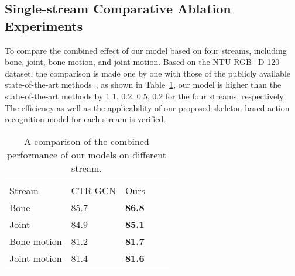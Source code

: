 \documentclass[letterpaper]{article} \usepackage[submission]{aaai23}  \usepackage{times}  \usepackage{helvet}  \usepackage{courier}  \usepackage[hyphens]{url}  \usepackage{graphicx} \urlstyle{rm} \def\UrlFont{\rm}  \usepackage{natbib}  \usepackage{caption} \frenchspacing  \setlength{\pdfpagewidth}{8.5in} \setlength{\pdfpageheight}{11in} \usepackage{algorithm}
\begin{document}
\subsection{Single-stream Comparative Ablation Experiments}
To compare the combined effect of our model based on four streams, including bone, joint, bone motion, and joint motion. Based on the NTU RGB+D 120 dataset, the comparison is made one by one with those of the publicly available state-of-the-art methods~\cite{2021Channel}, as shown in Table~\ref{tab:13}, our model is higher than the state-of-the-art methods by 1.1, 0.2, 0.5, 0.2 for the four streams, respectively. The efficiency as well as the applicability of our proposed skeleton-based action recognition model for each stream is verified.


\begin{table}[htp]
 \centering


\begin{tabular}{lllll}
\hline\noalign{\smallskip}
Stream & CTR-GCN &Ours\\
\noalign{\smallskip}\hline\noalign{\smallskip}
Bone&85.7&{\bf86.8}\\
Joint& 84.9&{\bf 85.1}\\
Bone motion& 81.2&{\bf 81.7}\\
Joint motion&81.4&{\bf81.6}\\

\noalign{\smallskip}\hline
\end{tabular}
\caption{A comparison of the combined performance of our models on different stream.}
\label{tab:13}
\end{table}
\end{document}

